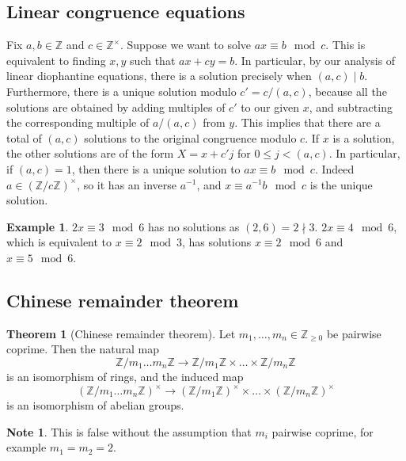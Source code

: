 \documentclass{article}
\newcommand{\Z}{\mathbb{Z}}
\newcommand{\rb}[1]{\left( #1 \right)}
\newcommand{\unit}[1]{\rb{\Z / #1\Z}^\times}
\theoremstyle{definition}\newtheorem{definition}{Definition}
\theoremstyle{definition}\newtheorem{remark}[definition]{Remark}
\theoremstyle{definition}\newtheorem*{example}{Example}
\theoremstyle{definition}\newtheorem*{note}{Note}
\newtheorem{theorem}[definition]{Theorem}
\begin{document}

\subsection{Linear congruence equations}

Fix $ a, b \in \Z $ and $ c \in \Z^\times $. Suppose we want to solve $ ax \equiv b \mod c $. This is equivalent to finding $ x, y $ such that $ ax + cy = b $. In particular, by our analysis of linear diophantine equations, there is a solution precisely when $ \rb{a, c} \mid b $. Furthermore, there is a unique solution modulo $ c' = c / \rb{a, c} $, because all the solutions are obtained by adding multiples of $ c' $ to our given $ x $, and subtracting the corresponding multiple of $ a / \rb{a, c} $ from $ y $. This implies that there are a total of $ \rb{a, c} $ solutions to the original congruence modulo $ c $. If $ x $ is a solution, the other solutions are of the form $ X = x + c'j $ for $ 0 \le j < \rb{a, c} $. In particular, if $ \rb{a, c} = 1 $, then there is a unique solution to $ ax \equiv b \mod c $. Indeed $ a \in \unit{c} $, so it has an inverse $ a^{-1} $, and $ x \equiv a^{-1}b \mod c $ is the unique solution.

\begin{example}
$ 2x \equiv 3 \mod 6 $ has no solutions as $ \rb{2, 6} = 2 \nmid 3 $. $ 2x \equiv 4 \mod 6 $, which is equivalent to $ x \equiv 2 \mod 3 $, has solutions $ x \equiv 2 \mod 6 $ and $ x \equiv 5 \mod 6 $.
\end{example}

\subsection{Chinese remainder theorem}

\begin{theorem}[Chinese remainder theorem]
Let $ m_1, \dots, m_n \in \Z_{\ge 0} $ be pairwise coprime. Then the natural map
$$ \Z / m_1 \dots m_n\Z \to \Z / m_1\Z \times \dots \times \Z / m_n\Z $$
is an isomorphism of rings, and the induced map
$$ \unit{m_1 \dots m_n} \to \unit{m_1} \times \dots \times \unit{m_n} $$
is an isomorphism of abelian groups.
\end{theorem}

\begin{note}
This is false without the assumption that $ m_i $ pairwise coprime, for example $ m_1 = m_2 = 2 $.
\end{note}
\end{document}
